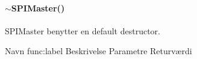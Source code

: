 \paragraph{$\sim$SPIMaster()}
SPIMaster benytter en default destructor. 





\begin{functionDescription}
{Navn}
{func:label}
{Beskrivelse}
{Parametre}
{Returværdi}
\end{functionDescription}